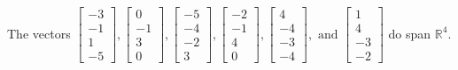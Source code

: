 \begin{exercise}
\begin{exerciseStatement}
  \end{exerciseStatement}
  \begin{exerciseAnswer}
   The vectors \(\left[\begin{array}{r}
-3 \\
-1 \\
1 \\
-5
\end{array}\right] , \left[\begin{array}{r}
0 \\
-1 \\
3 \\
0
\end{array}\right] , \left[\begin{array}{r}
-5 \\
-4 \\
-2 \\
3
\end{array}\right] , \left[\begin{array}{r}
-2 \\
-1 \\
4 \\
0
\end{array}\right] , \left[\begin{array}{r}
4 \\
-4 \\
-3 \\
-4
\end{array}\right] , \text{ and } \left[\begin{array}{r}
1 \\
4 \\
-3 \\
-2
\end{array}\right]\) 
  	 do  
	span \(\mathbb{R}^4\).
  


  \end{exerciseAnswer}
\end{exercise}